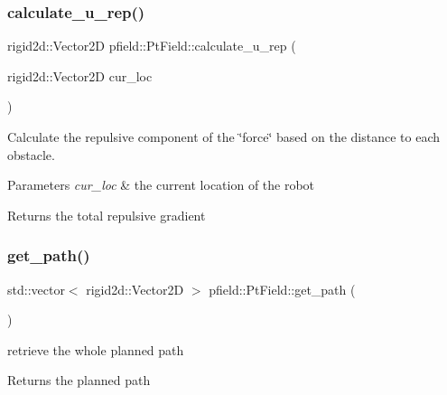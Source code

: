 \subsubsection{\texorpdfstring{calculate\+\_\+u\+\_\+rep()}{calculate\_u\_rep()}}
{\footnotesize\ttfamily rigid2d\+::\+Vector2D pfield\+::\+Pt\+Field\+::calculate\+\_\+u\+\_\+rep (\begin{DoxyParamCaption}\item[{rigid2d\+::\+Vector2D}]{cur\+\_\+loc }\end{DoxyParamCaption})\hspace{0.3cm}{\ttfamily [private]}}



Calculate the repulsive component of the \char`\"{}force\char`\"{} based on the distance to each obstacle. 


\begin{DoxyParams}{Parameters}
{\em cur\+\_\+loc} & the current location of the robot \\
\hline
\end{DoxyParams}
\begin{DoxyReturn}{Returns}
the total repulsive gradient 
\end{DoxyReturn}
\mbox{\label{classpfield_1_1PtField_ab936f2bf686f45a2a11825e5a8911356}} 
\subsubsection{\texorpdfstring{get\+\_\+path()}{get\_path()}}
{\footnotesize\ttfamily std\+::vector$<$ rigid2d\+::\+Vector2D $>$ pfield\+::\+Pt\+Field\+::get\+\_\+path (\begin{DoxyParamCaption}{ }\end{DoxyParamCaption})}



retrieve the whole planned path 

\begin{DoxyReturn}{Returns}
the planned path 
\end{DoxyReturn}
\mbox{\label{classpfield_1_1PtField_af1faea5a1127d6df5e06727391227ade}} 
